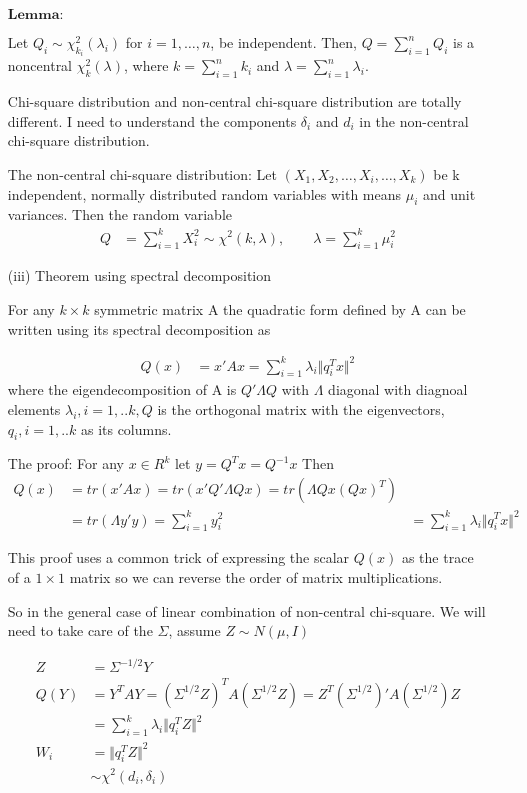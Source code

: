\documentclass[11pt]{article} %
\begin{document}
\begin{itemize}
		$\textbf{Lemma:}$	
		
		Let $Q_i \sim \chi^2 _{k_i}(\lambda_i)$ for $i=1,…,n$, be independent. Then, $Q = \sum_{i=1}^n Q_i$ is a noncentral $\chi^2_k(\lambda)$, where $k = \sum_{i=1}^n k_i$ and $\lambda =\sum_{i=1}^n \lambda_i$.
		
		Chi-square distribution and non-central chi-square distribution are totally different. I need to understand the components $\delta_i$ and $d_i$ in the non-central chi-square distribution.
		
		
		The non-central chi-square distribution: Let $(X_{1},X_{2},\ldots ,X_{i},\ldots ,X_{k})$ be k independent, normally distributed random variables with means $\mu _{i}$ and unit variances. Then the random variable
		\begin{align*}
			Q &= \sum_{i=1}^k X_i^2 \sim \chi^2(k, \lambda), \qquad \lambda = \sum_{i=1}^k \mu_i^2
		\end{align*}
	
	\item [(iii)] Theorem using spectral decomposition
	
	For any $k \times k$ symmetric matrix A the quadratic form defined by A can be written using its spectral decomposition as
	
\begin{align*}
	Q(x) &= x' A x = \sum_{i=1}^k \lambda_i \Vert q_i^T x\Vert^2
\end{align*}	
	where the eigendecomposition of A is $Q'\Lambda Q$ with $\Lambda$ diagonal with diagnoal elements $\lambda_i, i=1,..k, Q$ is the orthogonal matrix with the eigenvectors, $q_i, i=1,..k$ as its columns. 
	
	The proof: For any $x \in R^k$ let $y= Q^T x = Q^{-1} x$ Then
\begin{align*}
	Q(x) &= tr(x' A x )= tr(x' Q' \Lambda Q x) = tr( \Lambda  Qx (Qx)^T)\\
	&= tr(\Lambda y' y) = \sum_{i=1}^k y_i^2
	&= \sum_{i=1}^k \lambda_i \Vert q_i^T x\Vert^2
\end{align*}		
	
	This proof uses a common trick of expressing the scalar $Q(x)$ as the trace of a $1 \times 1$ matrix so we can reverse the order of matrix multiplications.
	
	So in the general case of linear combination of non-central chi-square. We will need to take care of the $\Sigma$, assume $Z \sim N(\mu, I)$
	
\begin{align*}
	Z &= \Sigma^{-1/2} Y \\
	Q(Y) &= Y^T A Y = (\Sigma^{1/2} Z)^T A (\Sigma^{1/2} Z) = Z^T (\Sigma^{1/2})' A (\Sigma^{1/2}) Z \\
	&=  \sum_{i=1}^k \lambda_i \Vert q_i^T Z\Vert^2\\
	W_i &= \Vert q_i^T Z\Vert^2 \\
	& \sim \chi^2(d_i, \delta_i)
\end{align*}	


\end{itemize}
\end{document}
